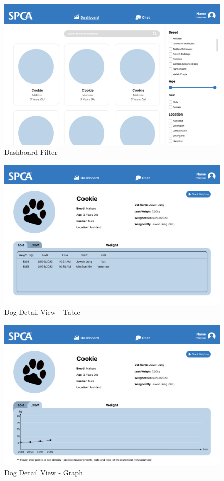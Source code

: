 \begin{figure}[h]
\centering
\includegraphics[width=\textwidth]{proposal/parts/dashboard-filter.png}
\caption{Dashboard Filter}
\end{figure}

\begin{figure}[h]
\centering
\includegraphics[width=\textwidth]{proposal/parts/dashboard-dog-detail-table.png}
\caption{Dog Detail View - Table}
\end{figure}

\begin{figure}[h]
\centering
\includegraphics[width=\textwidth]{proposal/parts/dashboard-dog-detail-graph.png}
\caption{Dog Detail View - Graph}
\end{figure}


